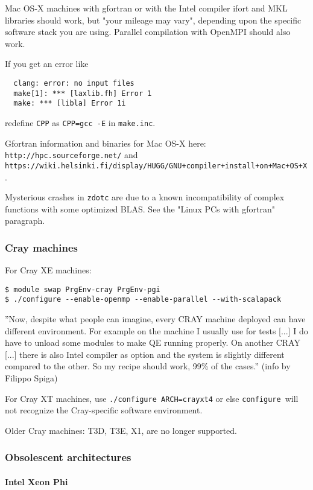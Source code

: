 \documentclass[12pt,a4paper]{article}
\def\configure{\texttt{configure}}
\begin{document}
Mac OS-X machines with gfortran or with the Intel compiler ifort
and MKL libraries should work, but "your mileage may vary", depending
upon the specific software stack you are using. Parallel compilation
with OpenMPI should also work.

If you get an error like
\begin{verbatim}
  clang: error: no input files
  make[1]: *** [laxlib.fh] Error 1
  make: *** [libla] Error 1i
\end{verbatim}
redefine \texttt{CPP} as \texttt{CPP=gcc -E} in \texttt{make.inc}.

Gfortran information and binaries for Mac OS-X here:
\texttt{http://hpc.sourceforge.net/} and
\texttt{https://wiki.helsinki.fi/display/HUGG/GNU+compiler+install+on+Mac+OS+X}.

Mysterious crashes in \texttt{zdotc} are due to a known incompatibility of
complex functions with some optimized BLAS. See the "Linux PCs with gfortran"
paragraph.

\subsubsection{Cray machines}

For Cray XE machines:
\begin{verbatim}
$ module swap PrgEnv-cray PrgEnv-pgi
$ ./configure --enable-openmp --enable-parallel --with-scalapack
\end{verbatim}

''Now, despite what people can imagine, every CRAY machine deployed can
have different environment. For example on the machine I usually use
for tests [...] I do have to unload some modules to make QE running
properly. On another CRAY [...] there is also Intel compiler as option
and the system is slightly different compared to the other.
So my recipe should work, 99\% of the cases.'' (info by Filippo Spiga)

For Cray XT machines, use \texttt{./configure ARCH=crayxt4} or else
\configure\ will not recognize the Cray-specific software environment.

Older Cray machines: T3D, T3E, X1, are no longer supported.

\subsubsection{Obsolescent architectures}

\paragraph{Intel Xeon Phi}
\end{document}
